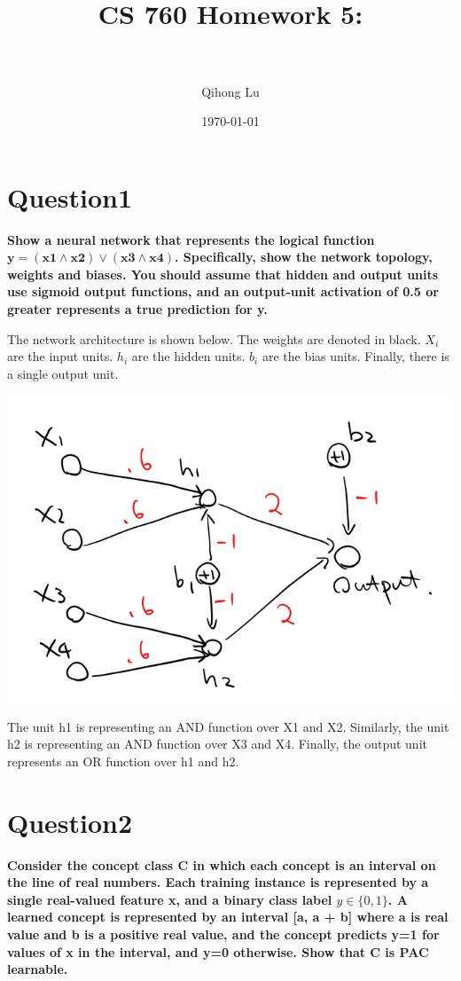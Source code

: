 \documentclass[paper=a4, fontsize=11pt]{scrartcl} %
\title{	
\normalfont \normalsize 
\horrule{0.5pt} \\[0.4cm] %
\huge CS 760 Homework 5:\\ %
\horrule{2pt} \\[0.5cm] %
}
\author{Qihong Lu} %
\date{\normalsize\today} %
\numberwithin{equation}{section} %
\numberwithin{figure}{section} %
\numberwithin{table}{section} %
\begin{document}
\maketitle %

\section*{Question1}
\textbf{
Show a neural network that represents the logical function $\mathbf{y = (x1 \land x2) \lor (x3 \land x4)}$. Specifically, show the network topology, weights and biases. You should assume that hidden and output units use sigmoid output functions, and an output-unit activation of 0.5 or greater represents a true prediction for y.\\ 
}

The network architecture is shown below. The weights are denoted in black. $X_i$ are the input units. $h_i$ are the hidden units. $b_i$ are the bias units. Finally, there is a single output unit. 

\begin{center}
	\includegraphics[scale=.4]{pics/hw5-1.png}
\end{center}


The unit h1 is representing an AND function over X1 and X2. 
Similarly, the unit h2 is representing an AND function over X3 and X4. Finally, the output unit represents an OR function over h1 and h2. 

\newpage
\section*{Question2}
\textbf{Consider the concept class C in which each concept is an interval on the line of real numbers. Each training instance is represented by a single real-valued feature x, and a binary class label \boldmath$y \in \{0, 1\}$. A learned concept is represented by an interval [a, a + b] where a is real value and b is a positive real value, and the concept predicts y=1 for values of x in the interval, and y=0 otherwise. Show that C is PAC learnable.}
\end{document}
